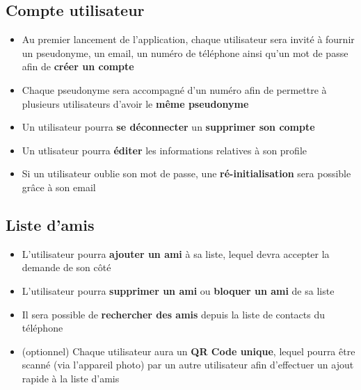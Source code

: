 \documentclass[french]{article}
\begin{document}
		\subsection{Compte utilisateur}
			\begin{itemize}
				\item Au premier lancement de l'application, chaque utilisateur sera invité à fournir un pseudonyme, un email, un numéro de téléphone ainsi qu'un mot de passe afin de \textbf{créer un compte} 
				\item Chaque pseudonyme sera accompagné d'un numéro afin de permettre à plusieurs utilisateurs d'avoir le \textbf{même pseudonyme}
				\item Un utilisateur pourra \textbf{se déconnecter} un \textbf{supprimer son compte}
				\item Un utlisateur pourra \textbf{éditer} les informations relatives à son profile
				\item Si un utilisateur oublie son mot de passe, une \textbf{ré-initialisation} sera possible grâce à son email
			\end{itemize}
	
		\subsection{Liste d'amis}
			\begin{itemize}
				\item L'utilisateur pourra \textbf{ajouter un ami} à sa liste, lequel devra accepter la demande de son côté
				\item L'utilisateur pourra \textbf{supprimer un ami} ou \textbf{bloquer un ami} de sa liste
				\item Il sera possible de \textbf{rechercher des amis} depuis la liste de contacts du téléphone
				\item (optionnel) Chaque utilisateur aura un \textbf{QR Code unique}, lequel pourra être scanné (via l'appareil photo) par un autre utilisateur afin d'effectuer un ajout rapide à la liste d'amis 
			\end{itemize}
		
\end{document}
